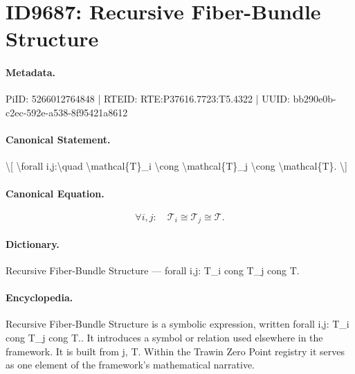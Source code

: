 \section*{ID9687: Recursive Fiber-Bundle Structure}
\paragraph{Metadata.}
PiID: 5266012764848 | RTEID: RTE:P37616.7723:T5.4322 | UUID: bb290e0b-c2ec-592e-a538-8f95421a8612

\paragraph{Canonical Statement.}
\textbackslash{}[ \textbackslash{}forall i,j:\textbackslash{}quad \textbackslash{}mathcal\{T\}\_i \textbackslash{}cong \textbackslash{}mathcal\{T\}\_j \textbackslash{}cong \textbackslash{}mathcal\{T\}. \textbackslash{}]

\paragraph{Canonical Equation.}
\[
\forall i,j:\quad \mathcal{T}_i \cong \mathcal{T}_j \cong \mathcal{T}.
\]

\paragraph{Dictionary.}
Recursive Fiber-Bundle Structure — forall i,j: T\_i cong T\_j cong T.

\paragraph{Encyclopedia.}
Recursive Fiber-Bundle Structure is a symbolic expression, written forall i,j: T\_i cong T\_j cong T.. It introduces a symbol or relation used elsewhere in the framework. It is built from j, T. Within the Trawin Zero Point registry it serves as one element of the framework's mathematical narrative.
